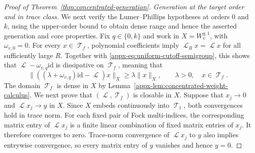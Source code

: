 \documentclass[11pt]{article}
\theoremstyle{myplain}
\theoremstyle{mydefinition}
\theoremstyle{remark}
\DeclareMathOperator{\cL}{\mathcal{L}}
\DeclareMathOperator{\cT}{\mathcal{T}}
\DeclareMathOperator{\1}{\mathds{1}}
\begin{document}
\begin{proof}[Proof of Theorem~\ref{thm:concentrated-generation}]
        \emph{Generation at the target order and in trace class.} We next verify the Lumer--Phillips hypotheses at orders $0$ and $k$, using the upper-order bound to obtain dense range and hence the asserted generation and core properties. Fix $q\in\{0,k\}$ and work in $X=W_v^{q,1}$, with $\omega_{v,0}=0$. For every $x\in\cT_f$, polynomial coefficients imply $\cL_Rx=\cL x$ for all sufficiently large $R$. Together with \eqref{appx-eq:uniform-cutoff-semigroup}, this shows that $\cL - \omega_{v,q}\mathrm{id}$ is dissipative on $\cT_f$, meaning that
        \begin{equation*}
            \|((\lambda + \omega_{v,q})\mathrm{id} - \cL)x\|_X \geq \lambda \|x\|_X,
            \qquad \lambda > 0,\quad x \in \cT_f.
        \end{equation*}
        The domain $\cT_f$ is dense in $X$ by Lemma~\ref{appx-lem:concentrated-weight-calculus}. We next prove that $(\cL,\cT_f)$ is closable in $X$. Suppose that $x_j\to0$ and $\cL x_j\to y$ in $X$. Since $X$ embeds continuously into $\cT_1$, both convergences hold in trace norm. For each fixed pair of Fock multi-indices, the corresponding matrix entry of $\cL x_j$ is a finite linear combination of fixed matrix entries of $x_j$. It therefore converges to zero. Trace-norm convergence of $\cL x_j$ to $y$ also implies entrywise convergence, so every matrix entry of $y$ vanishes and hence $y=0$.


\end{proof}
\end{document}

